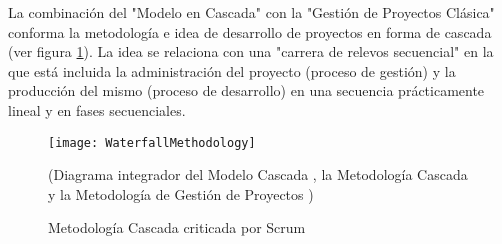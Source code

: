 La combinación del "Modelo en Cascada" con la "Gestión de Proyectos Clásica" conforma la metodología e idea de desarrollo de proyectos en forma de cascada (ver figura \ref{fig:WaterfallMethodology}). La idea se relaciona con una "carrera de relevos secuencial" en la que está incluida la administración del proyecto (proceso de gestión) y la producción del mismo (proceso de desarrollo) en una secuencia prácticamente lineal y en fases secuenciales.

\begin{figure}[h]
  \centering
  \texttt{[image: WaterfallMethodology]}
  \caption{Metodología Cascada criticada por Scrum}
  (Diagrama integrador del Modelo Cascada \cite{Winston-Royce-1970}, la Metodología Cascada \cite{Ken-Schwaber-1995} y la Metodología de Gestión de Proyectos \cite{PMBOK-1996})
  \centering
  \label{fig:WaterfallMethodology} %
\end{figure}
